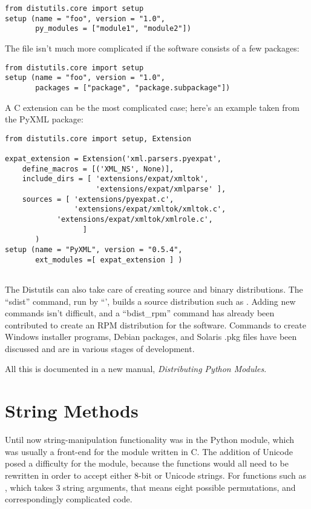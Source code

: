 \documentclass{howto}
\begin{document}
{\begin{verbatim}
from distutils.core import setup
setup (name = "foo", version = "1.0", 
       py_modules = ["module1", "module2"])
\end{verbatim}

The  file isn't much more complicated if the software
consists of a few packages:

\begin{verbatim}
from distutils.core import setup
setup (name = "foo", version = "1.0", 
       packages = ["package", "package.subpackage"])
\end{verbatim}

A C extension can be the most complicated case; here's an example taken from 
the PyXML package:


\begin{verbatim}
from distutils.core import setup, Extension

expat_extension = Extension('xml.parsers.pyexpat',
	define_macros = [('XML_NS', None)],
	include_dirs = [ 'extensions/expat/xmltok',
	                 'extensions/expat/xmlparse' ],
	sources = [ 'extensions/pyexpat.c',
	            'extensions/expat/xmltok/xmltok.c',
 		    'extensions/expat/xmltok/xmlrole.c',
                  ]
       )
setup (name = "PyXML", version = "0.5.4", 
       ext_modules =[ expat_extension ] )
	        
\end{verbatim}

The Distutils can also take care of creating source and binary
distributions.  The ``sdist'' command, run by ``', builds a source distribution such as .
Adding new commands isn't difficult, and a ``bdist_rpm'' command has
already been contributed to create an RPM distribution for the
software.  Commands to create Windows installer programs, Debian
packages, and Solaris .pkg files have been discussed and are in
various stages of development.

All this is documented in a new manual, \textit{Distributing Python
Modules}.

\section{String Methods}

Until now string-manipulation functionality was in the 
Python module, which was usually a front-end for the 
module written in C.  The addition of Unicode posed a difficulty for
the  module, because the functions would all need to be
rewritten in order to accept either 8-bit or Unicode strings.  For
functions such as , which takes 3 string
arguments, that means eight possible permutations, and correspondingly
complicated code.

}
\end{document}
